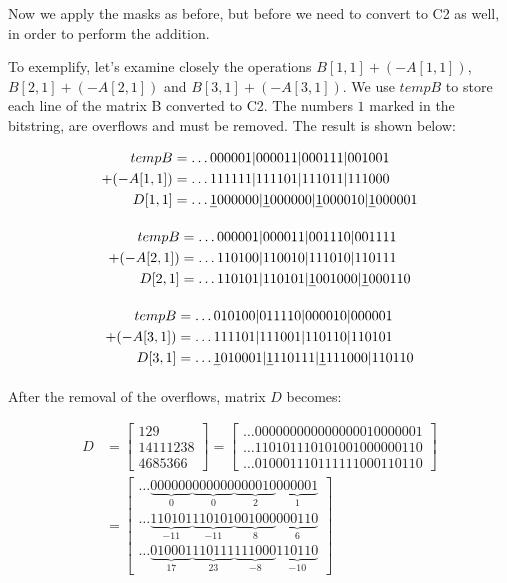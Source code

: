 \documentclass[10pt]{article}
\begin{document}
Now we apply the masks as before, but before we need to convert to C2 as well,
in order to perform the addition.

To exemplify, let's examine closely the operations $B[1,1] + (-A[1,1])$,
$B[2,1] + (-A[2,1])$ and $B[3,1] + (-A[3,1])$. We use $tempB$ to store each line
of the matrix B converted to C2. The numbers $1$ marked in the bitstring, are
overflows and must be removed. The result is shown below:

\begin{align*}
	tempB	&=\ldots000001|000011|000111|001001\\
    +(-A[1,1])	&=\ldots111111|111101|111011|111000\\
	D[1,1]
&=\ldots\sout{1}000000|\sout{1}000000|\sout{1}000010|\sout{1}000001
\end{align*}

\begin{align*}
	tempB 	&= \ldots000001|000011|001110|001111\\
      +(-A[2,1])&= \ldots110100|110010|111010|110111\\ 
      D[2,1]	&= \ldots110101|110101|\sout{1}001000|\sout{1}000110
\end{align*}

\begin{align*}
    tempB	&= \ldots010100|011110|000010|000001 \\
    +(-A[3,1])	&= \ldots111101|111001|110110|110101\\ 
    D[3,1]	&= \ldots\sout{1}010001|\sout{1}110111|\sout{1}111000|110110
\end{align*}

After the removal of the overflows, matrix $D$ becomes:

\begin{align}
	D &=\begin{bmatrix}
		129\\ 
		14111238\\ 
		4685366
	    \end{bmatrix} 
        =
        \begin{bmatrix}
	  \ldots000000000000000010000001 \\
	  \ldots110101110101001000000110 \\
	  \ldots010001110111111000110110
	\end{bmatrix}
	\\\nonumber
	&=\begin{bmatrix}
\ldots\underbrace{000000}_{0}\underbrace{000000}_{0}\underbrace{000010}_{2}
\underbrace{000001}_{1} \\ 			 
\ldots\underbrace{110101}_{-11}\underbrace{110101}_{-11}\underbrace{001000}_{8}
\underbrace{000110}_{6} \\
\ldots\underbrace{010001}_{17}\underbrace{110111}_{23}\underbrace{111000}_{-8}
\underbrace{110110}_{-10}
	  \end{bmatrix}
\end{align}
\end{document}
